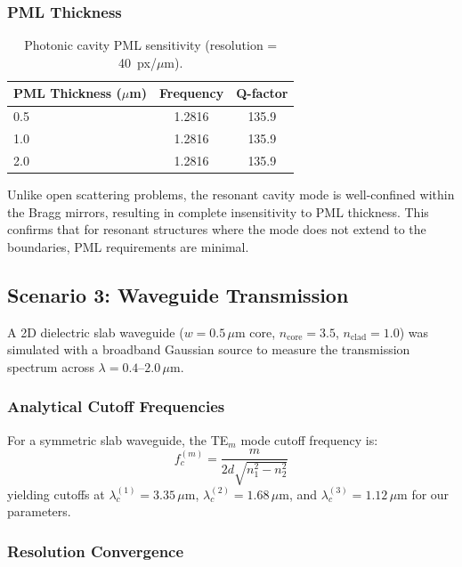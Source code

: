 \documentclass[12pt, a4paper]{article}
\begin{document}
\subsubsection{PML Thickness}

\begin{table}[H]
\centering
\caption{Photonic cavity PML sensitivity (resolution = 40~px/$\mu$m).}
\label{tab:cavity_pml}
\begin{tabular}{lcc}
\toprule
PML Thickness ($\mu$m) & Frequency & Q-factor \\
\midrule
0.5 & 1.2816 & 135.9 \\
1.0 & 1.2816 & 135.9 \\
2.0 & 1.2816 & 135.9 \\
\bottomrule
\end{tabular}
\end{table}

Unlike open scattering problems, the resonant cavity mode is well-confined within the Bragg mirrors, resulting in complete insensitivity to PML thickness. This confirms that for resonant structures where the mode does not extend to the boundaries, PML requirements are minimal.

\subsection{Scenario 3: Waveguide Transmission}

A 2D dielectric slab waveguide ($w = 0.5\,\mu$m core, $n_\text{core} = 3.5$, $n_\text{clad} = 1.0$) was simulated with a broadband Gaussian source to measure the transmission spectrum across $\lambda = 0.4$--$2.0\,\mu$m.

\subsubsection{Analytical Cutoff Frequencies}

For a symmetric slab waveguide, the TE$_m$ mode cutoff frequency is:
\begin{equation}
    f_c^{(m)} = \frac{m}{2d\sqrt{n_1^2 - n_2^2}}
\end{equation}
yielding cutoffs at $\lambda_c^{(1)} = 3.35\,\mu$m, $\lambda_c^{(2)} = 1.68\,\mu$m, and $\lambda_c^{(3)} = 1.12\,\mu$m for our parameters.

\subsubsection{Resolution Convergence}
\end{document}
